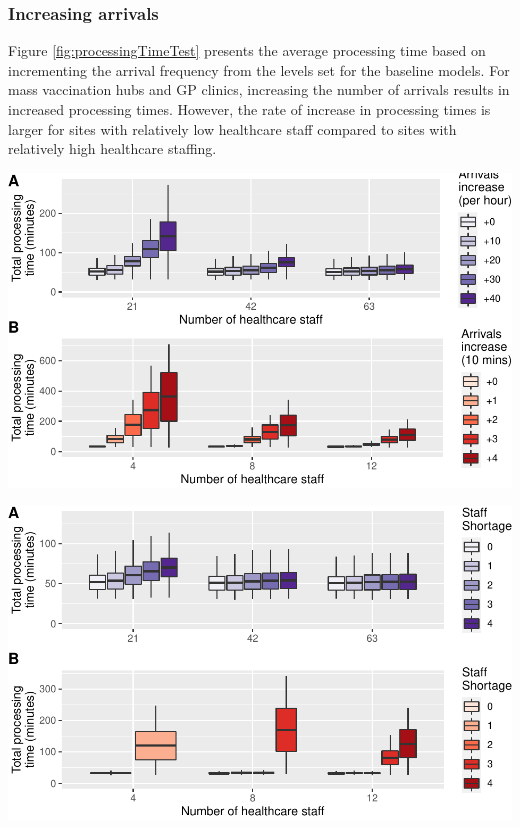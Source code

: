\documentclass{article}
\let\origfigure\figure
\let\endorigfigure\endfigure
\renewenvironment{figure}[1][2] {
    \expandafter\origfigure\expandafter[H]
} {
    \endorigfigure
}
\begin{document}
\hypertarget{increasing-arrivals}{%
\subsubsection{Increasing arrivals}\label{increasing-arrivals}}

Figure \ref{fig:processingTimeTest} presents the average processing time
based on incrementing the arrival frequency from the levels set for the
baseline models. For mass vaccination hubs and GP clinics, increasing
the number of arrivals results in increased processing times. However,
the rate of increase in processing times is larger for sites with
relatively low healthcare staff compared to sites with relatively high
healthcare staffing.

\begin{figure}

{\centering \includegraphics{Preprint_files/figure-latex/processingTimeTest-1} 

}

\caption{Increase in processing time with increased arrivals by site size for mass vaccination hubs (A) and GP vaccination clinics (B)}\label{fig:processingTimeTest}
\end{figure}

\begin{figure}

{\centering \includegraphics{Preprint_files/figure-latex/staffShortageTest-1} 

}

\caption{Increase in processing time with staff shortages by site size}\label{fig:staffShortageTest}
\end{figure}
\end{document}
